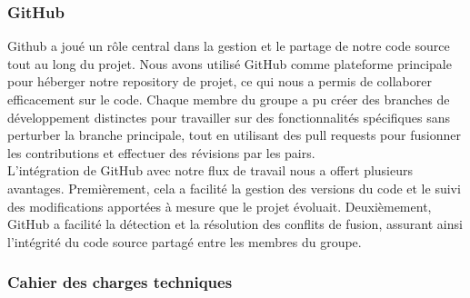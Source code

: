\subsubsection{GitHub}

Github a joué un rôle central dans la gestion et le partage de notre code source tout au long du projet. 
Nous avons utilisé GitHub comme plateforme principale pour héberger notre repository de projet, ce qui nous a permis de collaborer efficacement sur le code. 
Chaque membre du groupe a pu créer des branches de développement distinctes pour travailler sur des fonctionnalités spécifiques sans perturber la branche principale, tout en utilisant des pull requests pour fusionner les contributions et effectuer des révisions par les pairs.
\\

L'intégration de GitHub avec notre flux de travail nous a offert plusieurs avantages. 
Premièrement, cela a facilité la gestion des versions du code et le suivi des modifications apportées à mesure que le projet évoluait. 
Deuxièmement, GitHub a facilité la détection et la résolution des conflits de fusion, assurant ainsi l'intégrité du code source partagé entre les membres du groupe. 
\\

\subsubsection{Cahier des charges techniques}

